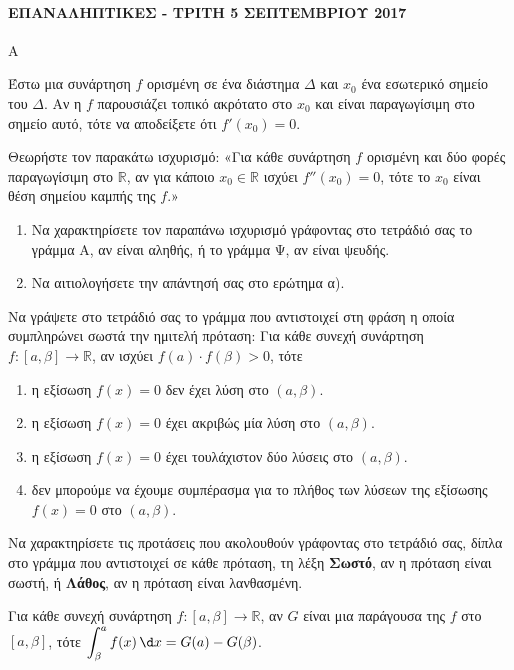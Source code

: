 \paragraph{ΕΠΑΝΑΛΗΠΤΙΚΕΣ - ΤΡΙΤΗ 5 ΣΕΠΤΕΜΒΡΙΟΥ 2017}
\begin{thema}{Α}
\begin{erwthma}
    \item Έστω μια συνάρτηση $f$ ορισμένη σε ένα διάστημα $\Delta$ και $x_0$ ένα εσωτερικό σημείο του $\Delta$. Αν η $f$ παρουσιάζει τοπικό ακρότατο στο $x_0$ και είναι παραγωγίσιμη στο σημείο αυτό, τότε να αποδείξετε ότι $f'(x_0) = 0$. 
    \item Θεωρήστε τον παρακάτω ισχυρισμό: «Για κάθε συνάρτηση $f$ ορισμένη και δύο φορές παραγωγίσιμη στο $\mathbb{R}$, αν για κάποιο $x_0 \in \mathbb{R}$ ισχύει $f''(x_0) = 0$, τότε το $x_0$ είναι θέση σημείου καμπής της $f$.»
    \begin{enumerate}[label=\alph*)]
        \item Να χαρακτηρίσετε τον παραπάνω ισχυρισμό γράφοντας στο τετράδιό σας το γράμμα Α, αν είναι αληθής, ή το γράμμα Ψ, αν είναι ψευδής. 
        \item Να αιτιολογήσετε την απάντησή σας στο ερώτημα α). 
    \end{enumerate}
    \item Να γράψετε στο τετράδιό σας το γράμμα που αντιστοιχεί στη φράση η οποία συμπληρώνει σωστά την ημιτελή πρόταση: Για κάθε συνεχή συνάρτηση $f : [a, \beta] \to \mathbb{R}$, αν ισχύει $f(a) \cdot f(\beta) > 0$, τότε
    \begin{enumerate}[label=\alph*)]
        \item η εξίσωση $f(x) = 0$ δεν έχει λύση στο $(a, \beta)$.
        \item η εξίσωση $f(x) = 0$ έχει ακριβώς μία λύση στο $(a, \beta)$.
        \item η εξίσωση $f(x) = 0$ έχει τουλάχιστον δύο λύσεις στο $(a, \beta)$.
        \item δεν μπορούμε να έχουμε συμπέρασμα για το πλήθος των λύσεων της εξίσωσης $f(x) = 0$ στο $(a, \beta)$.
    \end{enumerate}
    \item Να χαρακτηρίσετε τις προτάσεις που ακολουθούν γράφοντας στο τετράδιό σας, δίπλα στο γράμμα που αντιστοιχεί σε κάθε πρόταση, τη λέξη \textbf{Σωστό}, αν η πρόταση είναι σωστή, ή \textbf{Λάθος}, αν η πρόταση είναι λανθασμένη.
    \begin{alist}
        \item Για κάθε συνεχή συνάρτηση $f : [a, \beta] \to \mathbb{R}$, αν $G$ είναι μια παράγουσα της $f$ στο $[a, \beta]$, τότε $\displaystyle\int_{\beta}^{a} f(x)\,\d x = G(a) - G(\beta)$.

\end{alist}
\end{erwthma}
\end{thema}

